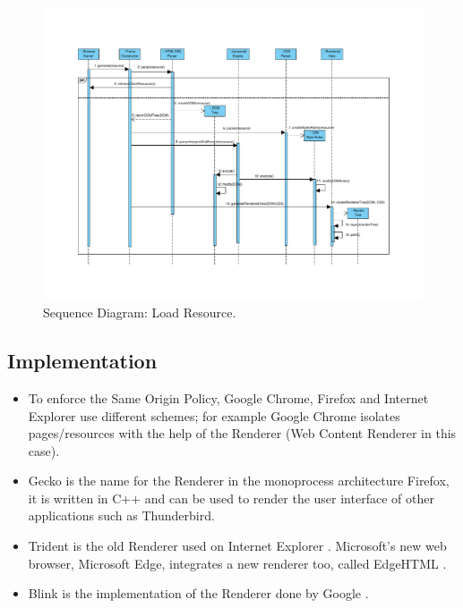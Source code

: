 \documentclass[prodmode,acmtecs]{acmsmall}
\begin{document}
    \begin{landscape}
      \begin{figure}[h!t]
      \vspace*{-2cm}
          \centering
          \hspace*{-1cm}\includegraphics[scale=0.8]{figures/LoadResource.pdf}
          \vspace*{-2cm}
          \caption{Sequence Diagram: Load Resource.}
          \label{fig:LoadResource}
      \end{figure}
    \end{landscape}

  \subsection*{Implementation}
    \begin{itemize}
      \item To enforce the Same Origin Policy, Google Chrome, Firefox and Internet Explorer use different schemes; for example Google Chrome isolates pages/resources with the help of the Renderer (Web Content Renderer in this case).
      \item Gecko \cite{gecko2} is the name for the Renderer in the monoprocess architecture Firefox, it is written in C++ and can be used to render the user interface of other applications such as Thunderbird.
      \item Trident is the old Renderer used on Internet Explorer \cite{Crowley2010}. Microsoft's new web browser, Microsoft Edge, integrates a new renderer too, called EdgeHTML \cite{edgehtml}.
      \item Blink is the implementation of the Renderer done by Google \cite{blink}.

    \end{itemize}
\end{document}
